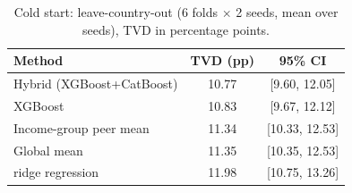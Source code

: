 \begin{table}
\caption{Cold start: leave-country-out (6 folds $\times$ 2 seeds, mean over seeds), TVD in percentage points.}\label{tab:A2}
\centering\footnotesize\setlength{\tabcolsep}{3pt}
\renewcommand{\arraystretch}{1.1}

\begin{tabular}{lcc}
\toprule
Method & TVD (pp) & 95\% CI \\
\midrule
Hybrid (XGBoost+CatBoost) & 10.77 & [9.60, 12.05] \\
XGBoost & 10.83 & [9.67, 12.12] \\
Income-group peer mean & 11.34 & [10.33, 12.53] \\
Global mean & 11.35 & [10.35, 12.53] \\
ridge regression & 11.98 & [10.75, 13.26] \\
\bottomrule
\end{tabular}
\end{table}

